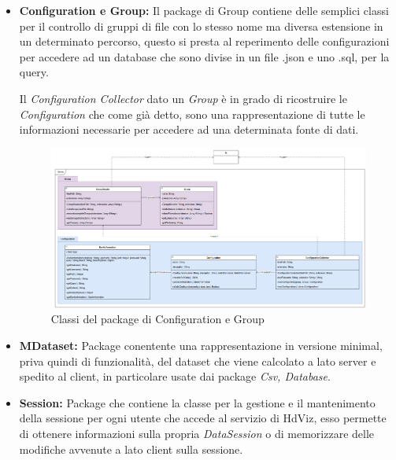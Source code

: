 \documentclass[../manuale_sviluppatore.tex]{subfiles}
\begin{document}
\begin{itemize}
	\newpage
	\item \textbf{Configuration e Group:} Il package di Group contiene delle semplici classi per il controllo di gruppi
	di file con lo stesso nome ma diversa estensione in un determinato percorso, questo si presta al reperimento delle 
	configurazioni per accedere ad un database che sono divise in un file .json e uno .sql, per la query. 

	Il \emph{Configuration Collector} dato un \emph{Group} è in grado di ricostruire le \emph{Configuration} che 
	come già detto, sono una rappresentazione di tutte le informazioni necessarie per accedere ad una determinata fonte di dati.
	
	\begin{figure}[H]
		\centering
		\includegraphics[width=18cm]{img/server-group.png}
		\caption{Classi del package di Configuration e Group}
	\end{figure}

	\item \textbf{MDataset:} Package conentente una rappresentazione in versione minimal, priva quindi di funzionalità, del dataset
	che viene calcolato a lato server e spedito al client, in particolare usate dai package \emph{Csv, Database}.

	\item \textbf{Session:} Package che contiene la classe per la gestione e il mantenimento della sessione per ogni utente che 
	accede al servizio di HdViz, esso permette di ottenere informazioni sulla propria \emph{DataSession} o di memorizzare delle 
	modifiche avvenute a lato client sulla sessione.

\end{itemize}
\end{document}
